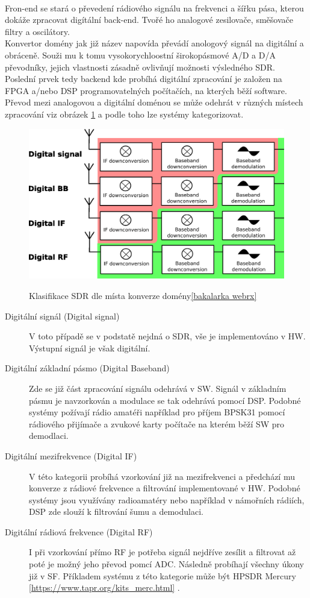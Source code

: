 \documentclass{ctuthesis}
\begin{document}
\\
Fron-end se stará o převedení rádiového signálu na frekvenci a šířku pása, kterou dokáže zpracovat digítální back-end. Tvořé ho analogové zesilovače, směšovače filtry a oscilátory.\\
Konvertor domény jak již název napovída převádí anologový signál na digitální a obráceně. Souži mu k tomu vysokorychloostní širokopásmové A/D a D/A převodníky, jejich vlastnosti zásadně ovlivňují možnosti výsledného SDR. \\
 Poslední prvek tedy backend kde probíhá digitální zpracování je založen na FPGA a/nebo DSP programovatelných počítačích, na kterých běží software.\\
Převod mezi analogovou a digitální  doménou se může odehrát v různých místech zpracování viz obrázek  \ref{SDRconversion} a podle toho lze systémy kategorizovat.
\begin{figure}
\caption{Klasifikace SDR dle místa konverze domény\ref{bakalarka webrx}}
\includegraphics[width=1\textwidth]{./images/SDRconversion.png}
\label{SDRconversion}
\end{figure}
\begin{description}
\item[Digitální signál (Digital signal)]
V toto případě se v podstatě nejdná o SDR, vše je implementováno v HW. Výstupní signál je však digitální.
\item[Digitální základní pásmo (Digital Baseband)]
Zde se již část zpracování signálu odehrává v SW. Signál v základním pásmu je navzorkován a modulace se tak odehrává pomocí DSP. Podobné systémy požívají rádio amatéři například pro příjem BPSK31 pomocí rádiového přijímače a zvukové karty počítače na kterém běží SW pro demodlaci.
\item[Digitální mezifrekvence (Digital IF)]
V této kategorii probíhá vzorkování již na mezifrekvenci a předchází mu konverze z rádiové frekvence a filtrování implementované v HW. Podobné systémy jsou využívány radioamatéry nebo například v námořních rádiích, DSP zde slouží k filtrování šumu a demodulaci. 
\item[Digitální rádiová frekvence (Digital RF)]
I při vzorkování přímo RF je potřeba signál nejdříve zesílit a filtrovat až poté je možný jeho převod pomcí ADC. Následně probíhají všechny úkony již v SF. Příkladem systému z této kategorie může být HPSDR Mercury \ref{https://www.tapr.org/kits_merc.html} .
\end{description}
\end{document}
